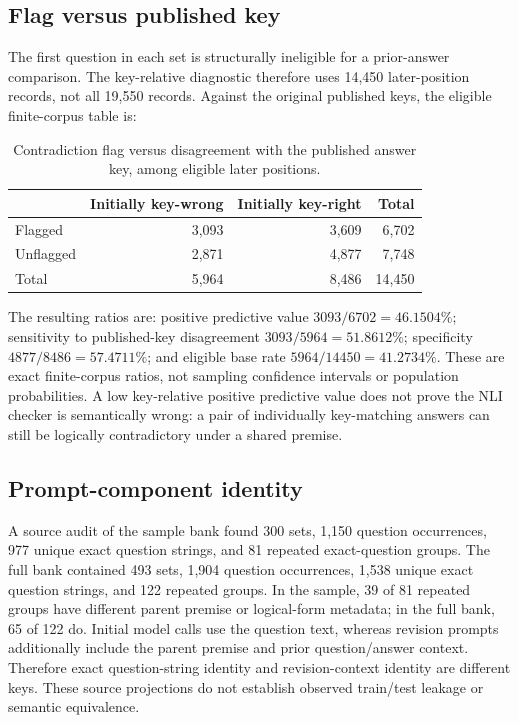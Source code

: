 \documentclass[11pt]{article}
\begin{document}
\subsection{Flag versus published key}
The first question in each set is structurally ineligible for a prior-answer comparison. The key-relative diagnostic therefore uses 14,450 later-position records, not all 19,550 records. Against the original published keys, the eligible finite-corpus table is:
\begin{table}[h]
\centering
\begin{tabular}{lrrr}
\toprule
 & Initially key-wrong & Initially key-right & Total \\
\midrule
Flagged & 3,093 & 3,609 & 6,702 \\
Unflagged & 2,871 & 4,877 & 7,748 \\
\midrule
Total & 5,964 & 8,486 & 14,450 \\
\bottomrule
\end{tabular}
\caption{Contradiction flag versus disagreement with the published answer key, among eligible later positions.}
\label{tab:flagkey}
\end{table}
The resulting ratios are: positive predictive value $3093/6702=46.1504\%$; sensitivity to published-key disagreement $3093/5964=51.8612\%$; specificity $4877/8486=57.4711\%$; and eligible base rate $5964/14450=41.2734\%$. These are exact finite-corpus ratios, not sampling confidence intervals or population probabilities. A low key-relative positive predictive value does not prove the NLI checker is semantically wrong: a pair of individually key-matching answers can still be logically contradictory under a shared premise.

\subsection{Prompt-component identity}
A source audit of the sample bank found 300 sets, 1,150 question occurrences, 977 unique exact question strings, and 81 repeated exact-question groups. The full bank contained 493 sets, 1,904 question occurrences, 1,538 unique exact question strings, and 122 repeated groups. In the sample, 39 of 81 repeated groups have different parent premise or logical-form metadata; in the full bank, 65 of 122 do. Initial model calls use the question text, whereas revision prompts additionally include the parent premise and prior question/answer context. Therefore exact question-string identity and revision-context identity are different keys. These source projections do not establish observed train/test leakage or semantic equivalence.
\end{document}
